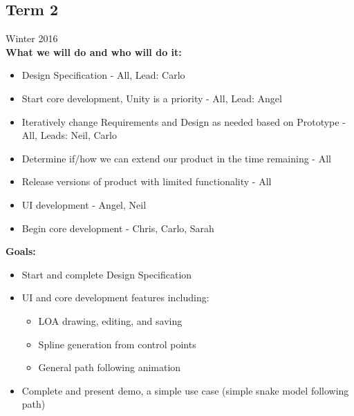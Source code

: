 \subsection{Term 2}
Winter 2016 \\
\textbf{What we will do and who will do it:}
\begin{itemize}
	\item Design Specification - All, Lead: Carlo
	\item Start core development, Unity is a priority - All, Lead: Angel
	\item Iteratively change Requirements and Design as needed based on Prototype - All, Leads: Neil, Carlo
	\item Determine if/how we can extend our product in the time remaining - All
	\item Release versions of product with limited functionality - All
	\item UI development - Angel, Neil
	\item Begin core development - Chris, Carlo, Sarah
\end{itemize} 

\textbf{Goals:}\\
\begin{itemize}
	\item Start and complete Design Specification
	\item UI and core development features including: 
	\begin{itemize}
		\item LOA drawing, editing, and saving
		\item Spline generation from control points
		\item General path following animation
	\end{itemize}
	\item Complete and present demo, a simple use case (simple snake model following path)
\end{itemize}

